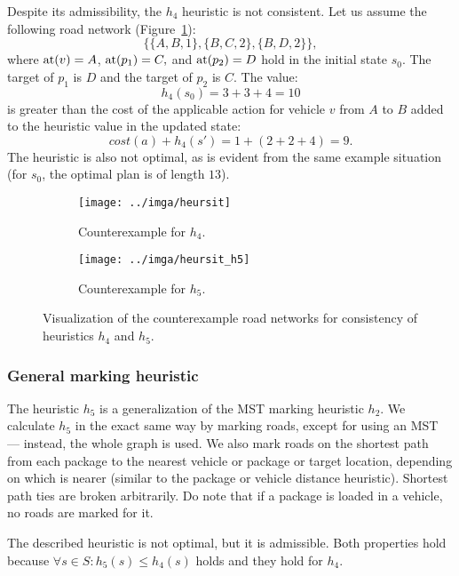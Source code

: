 Despite its admissibility, the $h_4$ heuristic is not consistent. Let us assume the following road network (Figure~\ref{fig:heursit}):
$$\{\{A, B, 1\}, \{B, C, 2\}, \{B, D, 2\}\},$$
where $\textrm{at}(v) = A$, $\textrm{at}(p_1) = C,$ and $\textrm{at}(p_2) = D$
hold in the initial state $s_0$.
The target of $p_1$ is $D$ and the target of $p_2$ is $C$.
The value:
$$h_4(s_0) = 3+3+4 = 10$$ is greater than the cost
of the applicable \drive{} action for vehicle $v$ from $A$ to $B$
added to the heuristic value in the updated state:
$$cost(a) + h_4(s') = 1 + (2+2+4) = 9.$$
The heuristic is also not optimal, as is evident from the same
example situation (for $s_0$, the optimal plan is of length $13$).

\begin{figure}[b]
\centering
\begin{subfigure}{0.48\textwidth}
\centering
\texttt{[image: ../imga/heursit]}
\caption{Counterexample for $h_4$.}
\label{fig:heursit}
\end{subfigure}
\begin{subfigure}{0.48\textwidth}
\centering
\texttt{[image: ../imga/heursit\_h5]}
\caption{Counterexample for $h_5$.}
\label{fig:heursit_h5}
\end{subfigure}
\caption{Visualization of the counterexample road networks
for consistency of heuristics $h_4$ and $h_5$.}
\label{fig:heursits}
\end{figure}

\subsubsection{General marking heuristic}\label{sfa5}

The heuristic $h_5$ is a generalization of the MST marking heuristic $h_2$. We calculate $h_5$ in the exact same way by marking roads,
except for
using an MST --- instead, the whole graph is used.
We also mark roads on the shortest path from each package to the nearest
vehicle or package or target location, depending on which is nearer (similar
to the package or vehicle distance heuristic).
Shortest path ties are broken arbitrarily.
Do note that if a package is loaded in a vehicle, no roads are marked for it.

The described heuristic is not optimal, but it is admissible.
Both properties hold because $\forall s \in S : h_5(s) \leq h_4(s)$ holds
and they hold for $h_4$.

